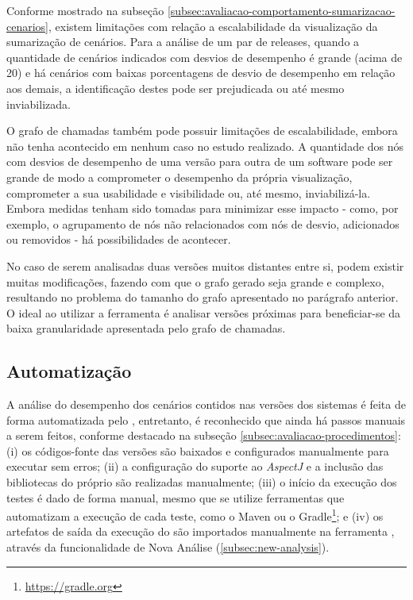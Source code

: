 Conforme mostrado na subseção \ref{subsec:avaliacao-comportamento-sumarizacao-cenarios}, existem limitações com relação a escalabilidade da visualização da sumarização de cenários. Para a análise de um par de releases, quando a quantidade de cenários indicados com desvios de desempenho é grande (acima de 20) e há cenários com baixas porcentagens de desvio de desempenho em relação aos demais, a identificação destes pode ser prejudicada ou até mesmo inviabilizada.

O grafo de chamadas também pode possuir limitações de escalabilidade, embora não tenha acontecido em nenhum caso no estudo realizado. A quantidade dos nós com desvios de desempenho de uma versão para outra de um software pode ser grande de modo a comprometer o desempenho da própria visualização, comprometer a sua usabilidade e visibilidade ou, até mesmo, inviabilizá-la. Embora medidas tenham sido tomadas para minimizar esse impacto - como, por exemplo, o agrupamento de nós não relacionados com nós de desvio, adicionados ou removidos - há possibilidades de acontecer.

No caso de serem analisadas duas versões muitos distantes entre si, podem existir muitas modificações, fazendo com que o grafo gerado seja grande e complexo, resultando no problema do tamanho do grafo apresentado no parágrafo anterior. O ideal ao utilizar a ferramenta é analisar versões próximas para beneficiar-se da baixa granularidade apresentada pelo grafo de chamadas.

\subsection{Automatização} \label{subsec:consideracoes-limitacoes-automatizacao}

A análise do desempenho dos cenários contidos nas versões dos sistemas é feita de forma automatizada pelo \textit{\perfMinerName}, entretanto, é reconhecido que ainda há passos manuais a serem feitos, conforme destacado na subseção \ref{subsec:avaliacao-procedimentos}: (i) os códigos-fonte das versões são baixados e configurados manualmente para executar sem erros; (ii) a configuração do suporte ao \textit{AspectJ} e a inclusão das bibliotecas do próprio \textit{\perfMinerName} são realizadas manualmente; (iii) o início da execução dos testes é dado de forma manual, mesmo que se utilize ferramentas que automatizam a execução de cada teste, como o Maven ou o Gradle\footnote{\href{https://gradle.org}{https://gradle.org}}; e (iv) os artefatos de saída da execução do \textit{\perfMinerName} são importados manualmente na ferramenta \textit{\toolName}, através da funcionalidade de Nova Análise (\ref{subsec:new-analysis}).

